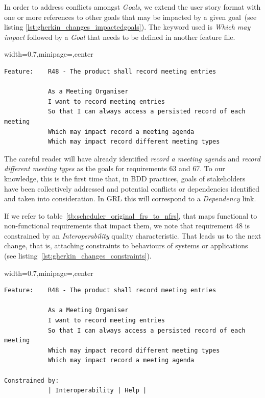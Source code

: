 \documentclass[dissertation,final]{softeng}
\newenvironment{featurecode}[1]
{ \lrbox\featurebox \begin{adjustbox}{width=#1\textwidth,minipage=\textwidth,center} }
{ \end{adjustbox}\endlrbox}
\newenvironment{featurelist}[2]
{
\newcommand{\setcaption}{\caption{#1}}
\newcommand{\setlabel}{\label{#2}}
}
{\begin{listing}[h!]\centering\usebox\featurebox\setcaption\setlabel\end{listing}}
\begin{document}
In order to address conflicts amongst \emph{Goals}, we extend the user story format with one or more references to other goals that may be impacted by a given goal~(see listing \ref{lst:gherkin_changes_impactedgoals}). The keyword used is \emph{Which may impact} followed by a \emph{Goal} that needs to be defined in another feature file.

\begin{featurelist}{Changes to Gherkin -- Impacted goals}{lst:gherkin_changes_impactedgoals}
\begin{featurecode}{0.7}
\begin{verbatim}
Feature:    R48 - The product shall record meeting entries

            As a Meeting Organiser
            I want to record meeting entries
            So that I can always access a persisted record of each meeting
            Which may impact record a meeting agenda
            Which may impact record different meeting types

\end{verbatim}
\end{featurecode}
\end{featurelist}

The careful reader will have already identified \emph{record a meeting agenda} and \emph{record different meeting types} as the goals for requirements 63 and 67. To our knowledge, this is the first time that, in BDD practices, goals of stakeholders have been collectively addressed and potential conflicts or dependencies identified and taken into consideration. In GRL this will correspond to a \emph{Dependency} link.

If we refer to table~\ref{tb:scheduler_original_frs_to_nfrs}, that maps functional to non-functional requirements that impact them, we note that requirement 48 is constrained by an \emph{Interoperability} quality characteristic. That leads us to the next change, that is, attaching constraints to behaviours of systems or applications (see listing~\ref{lst:gherkin_changes_constraints}).

\begin{featurelist}{Changes to Gherkin -- Constraints}{lst:gherkin_changes_constraints}
\begin{featurecode}{0.7}
\begin{verbatim}
Feature:    R48 - The product shall record meeting entries

            As a Meeting Organiser
            I want to record meeting entries
            So that I can always access a persisted record of each meeting
            Which may impact record different meeting types
            Which may impact record a meeting agenda
	
Constrained by:
            | Interoperability | Help |
\end{verbatim}
\end{featurecode}
\end{featurelist}
\end{document}
